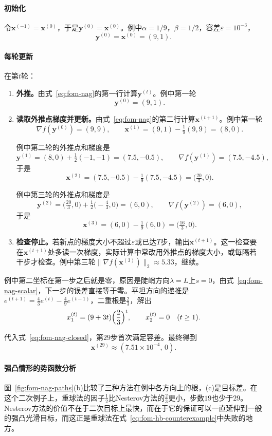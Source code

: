 \paragraph{初始化}
令$\bm{x}^{(-1)}=\bm{x}^{(0)}$，于是$\bm{y}^{(0)}=\bm{x}^{(0)}$。例中$\alpha=1/9$，$\beta=1/2$，容差$\varepsilon=10^{-3}$，
\[
 \bm{y}^{(0)}=\bm{x}^{(0)}=(9,1).
\]

\paragraph{每轮更新}
在第$t$轮：
\begin{enumerate}
 \item \textbf{外推。}由式~\eqref{eq:fom-nag}的第一行计算$\bm{y}^{(t)}$。例中第一轮
 \[
  \bm{y}^{(0)}=(9,1).
 \]
 \item \textbf{读取外推点梯度并更新。}由式~\eqref{eq:fom-nag}的第二行计算$\bm{x}^{(t+1)}$。例中第一轮
 \[
  \nabla f(\bm{y}^{(0)})=(9,9),\qquad\bm{x}^{(1)}=(9,1)-\tfrac19(9,9)=(8,0).
 \]

 例中第二轮的外推点和梯度是
 \[
  \bm{y}^{(1)}=(8,0)+\tfrac12(-1,-1)=(7.5,-0.5),\qquad\nabla f(\bm{y}^{(1)})=(7.5,-4.5),
 \]
 于是
 \[
  \bm{x}^{(2)}=(7.5,-0.5)-\tfrac19(7.5,-4.5)=\bigl(\tfrac{20}3,0\bigr).
 \]

 例中第三轮的外推点和梯度是
 \[
  \bm{y}^{(2)}=\bigl(\tfrac{20}3,0\bigr)+\tfrac12\bigl(-\tfrac43,0\bigr)=(6,0),\qquad\nabla f(\bm{y}^{(2)})=(6,0),
 \]
 于是
 \[
  \bm{x}^{(3)}=(6,0)-\tfrac19(6,0)=\bigl(\tfrac{16}3,0\bigr).
 \]
 \item \textbf{检查停止。}若新点的梯度大小不超过$\varepsilon$或已达$T$步，输出$\bm{x}^{(t+1)}$。这一检查要在$\bm{x}^{(t+1)}$处多读一次梯度，实际计算中常改用外推点的梯度大小，或每隔若干步才检查。例中第三轮$\lVert\nabla f(\bm{x}^{(3)})\rVert_2\approx5.33$，继续。
\end{enumerate}

例中第二坐标在第一步之后就是零，原因是陡峭方向$\lambda=L$上$s=0$，由式~\eqref{eq:fom-nag-scalar}，下一步的误差直接等于零。平坦方向的递推是$e^{(t+1)}=\tfrac43e^{(t)}-\tfrac49e^{(t-1)}$，二重根是$\tfrac23$，解出
\begin{equation}
 x_1^{(t)}=(9+3t)\Bigl(\frac23\Bigr)^t,\qquad x_2^{(t)}=0\quad(t\geq1).
 \label{eq:fom-nag-closed}
\end{equation}

代入式~\eqref{eq:fom-nag-closed}，第$29$步首次满足容差。最终得到
\[
 \bm{x}^{(29)}\approx(7.51\times10^{-4},\,0).
\]

\paragraph{强凸情形的势函数分析}
图~\ref{fig:fom-nag-paths}(b)比较了三种方法在例中各方向上的根，(c)是目标差。在这个二次例子上，重球法的因子$\tfrac12$比Nesterov方法的$\tfrac23$更小，步数$19$也少于$29$。Nesterov方法的价值不在于二次目标上最快，而在于它的保证可以一直延伸到一般的强凸光滑目标，而这正是重球法在式~\eqref{eq:fom-hb-counterexample}中失败的地方。

